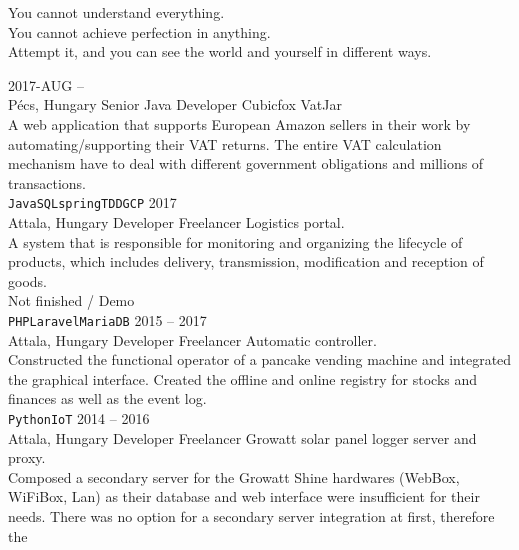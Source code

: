 \documentclass[9pt]{developercv} %
\begin{document}
{You cannot understand everything. \\
You cannot achieve perfection in anything. \\
Attempt it, and you can see the world and yourself in different ways.}



\begin{entrylist}
	\entry
		{2017-AUG -- \\ Pécs, Hungary}
		{Senior Java Developer}
		{Cubicfox}
		{VatJar\\
			A web application that supports European Amazon sellers in their work by automating/supporting their VAT returns.
			The entire VAT calculation mechanism have to deal with different government obligations and millions of transactions. \\
			\texttt{Java}\slashsep\texttt{SQL}\slashsep\texttt{spring}\slashsep\texttt{TDD}\slashsep\texttt{GCP}}
	\entry
		{2017 \\ Attala, Hungary}
		{Developer}
		{Freelancer}
		{Logistics portal. \\
			A system that is responsible for monitoring and organizing the lifecycle of products, which includes delivery,
			transmission, modification and reception of goods.\\
			Not finished / Demo
			\\ \texttt{PHP}\slashsep\texttt{Laravel}\slashsep\texttt{MariaDB}}
	\entry
		{2015 -- 2017 \\ Attala, Hungary}
		{Developer}
		{Freelancer}
		{Automatic controller. \\
			Constructed the functional operator of a pancake vending machine and integrated the graphical interface. Created the
			offline and online registry for stocks and finances as well as the event log.
			\\ \texttt{Python}\slashsep\texttt{IoT}}
	\entry
		{2014 -- 2016 \\ Attala, Hungary}
		{Developer}
		{Freelancer}
		{Growatt solar panel logger server and proxy. \\
			Composed a secondary server for the Growatt Shine hardwares (WebBox, WiFiBox, Lan) as their database and web
			interface were insufficient for their needs. There was no option for a secondary server integration at first, therefore the
}
\end{entrylist}
\end{document}
